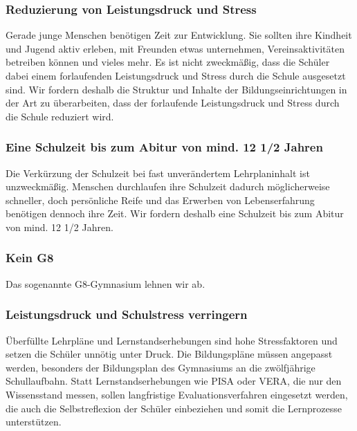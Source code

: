 \newpage
{}\label{wp:bildung:stress1}

\subsubsection{Reduzierung von Leistungsdruck und Stress}
\abstimmung 
Gerade junge Menschen benötigen Zeit zur Entwicklung. Sie sollten ihre Kindheit und Jugend aktiv erleben, mit Freunden etwas unternehmen, Vereinsaktivitäten betreiben können und vieles mehr. Es ist nicht zweckmäßig, dass die Schüler dabei einem forlaufenden Leistungsdruck und Stress durch die Schule ausgesetzt sind. Wir fordern deshalb die Struktur und Inhalte der Bildungseinrichtungen in der Art zu überarbeiten, dass der forlaufende Leistungsdruck und Stress durch die Schule reduziert wird.

\subsubsection{Eine Schulzeit bis zum Abitur von mind. 12 1/2 Jahren}
\abstimmung 
Die Verkürzung der Schulzeit bei fast unverändertem Lehrplaninhalt ist unzweckmäßig. Menschen durchlaufen ihre Schulzeit dadurch möglicherweise schneller, doch persönliche Reife und das Erwerben von Lebenserfahrung benötigen dennoch ihre Zeit. Wir fordern deshalb eine Schulzeit bis zum Abitur von mind. 12 1/2 Jahren.

\subsubsection{Kein G8}
\abstimmung 
Das sogenannte G8-Gymnasium lehnen wir ab.
 
\label{wp:bildung:stress2}

\subsubsection{Leistungsdruck und Schulstress verringern}
\abstimmung 
Überfüllte Lehrpläne und Lernstandserhebungen sind hohe Stressfaktoren und setzen die Schüler unnötig unter Druck. Die Bildungspläne müssen angepasst werden, besonders der Bildungsplan des Gymnasiums an die zwölfjährige Schullaufbahn. Statt Lernstandserhebungen wie PISA oder VERA, die nur den Wissensstand messen, sollen langfristige Evaluationsverfahren eingesetzt werden, die auch die Selbstreflexion der Schüler einbeziehen und somit die Lernprozesse unterstützen.
 
